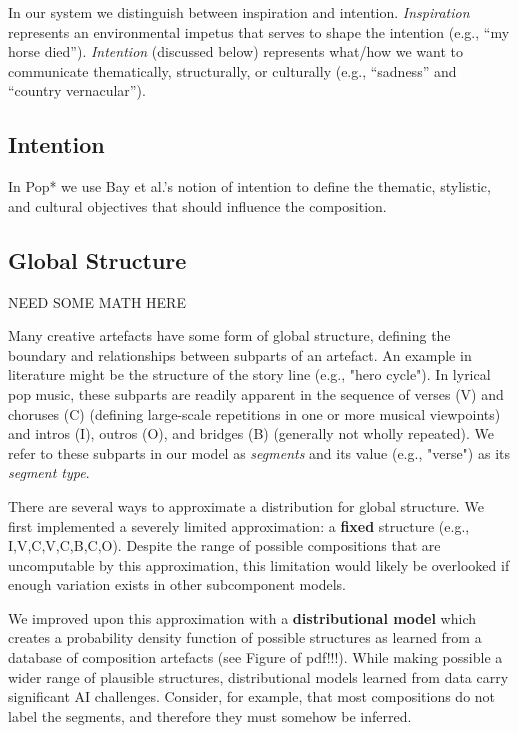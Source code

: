 \documentclass[letterpaper]{article}
\begin{document}
In our system we distinguish between inspiration and intention. \textit{Inspiration} represents an environmental impetus that serves to shape the intention (e.g., ``my horse died''). \textit{Intention} (discussed below) represents what/how we want to communicate thematically, structurally, or culturally (e.g., ``sadness'' and ``country vernacular'').

\subsection{Intention}

In Pop* we use Bay et al.'s notion of intention to define the thematic, stylistic, and cultural objectives that should influence the composition.

\subsection{Global Structure}

NEED SOME MATH HERE

Many creative artefacts have some form of global structure, defining the boundary and relationships between subparts of an artefact. An example in literature might be the structure of the story line (e.g., "hero cycle"). In lyrical pop music, these subparts are readily apparent in the sequence of verses (V) and choruses (C) (defining large-scale repetitions in one or more musical viewpoints) and intros (I), outros (O), and bridges (B) (generally not wholly repeated). We refer to these subparts in our model as \textit{segments} and its value (e.g., "verse") as its \textit{segment type}.

There are several ways to approximate a distribution for global structure. We first implemented a severely limited approximation: a \textbf{fixed} structure (e.g., I,V,C,V,C,B,C,O). Despite the range of possible compositions that are uncomputable by this approximation, this limitation would likely be overlooked if enough variation exists in other subcomponent models.

We improved upon this approximation with a \textbf{distributional model} which creates a probability density function of possible structures as learned from a database of composition artefacts (see Figure of pdf!!!). While making possible a wider range of plausible structures, distributional models learned from data carry significant AI challenges. Consider, for example, that most compositions do not label the segments, and therefore they must somehow be inferred.
\end{document}

